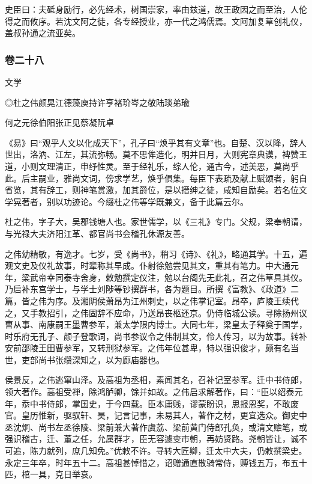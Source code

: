 \documentclass[]{article}
\begin{document}
史臣曰：夫砥身励行，必先经术，树国崇家，率由兹道，故王政因之而至治，人伦得之而攸序。若沈文阿之徒，各专经授业，亦一代之鸿儒焉。文阿加复草创礼仪，盖叔孙通之流亚矣。

\hypertarget{header-n5092}{%
\subsubsection{卷二十八}\label{header-n5092}}

文学

◎杜之伟颜晃江德藻庾持许亨褚玠岑之敬陆琰弟瑜

何之元徐伯阳张正见蔡凝阮卓

《易》曰``观乎人文以化成天下''，孔子曰``焕乎其有文章''也。自楚、汉以降，辞人世出，洛汭、江左，其流弥畅。莫不思侔造化，明并日月，大则宪章典谟，裨赞王道，小则文理清正，申纾性灵。至于经礼乐，综人伦，通古今，述美恶，莫尚乎此。后主嗣业，雅尚文词，傍求学艺，焕乎俱集。每臣下表疏及献上赋颂者，躬自省览，其有辞工，则神笔赏激，加其爵位，是以搢绅之徒，咸知自励矣。若名位文学晃著者，别以功迹论。今缀杜之伟等学既兼文，备于此篇云尔。

杜之伟，字子大，吴郡钱塘人也。家世儒学，以《三礼》专门。父规，梁奉朝请，与光禄大夫济阳江革、都官尚书会稽孔休源友善。

之伟幼精敏，有逸才。七岁，受《尚书》，稍习《诗》、《礼》，略通其学。十五，遍观文史及仪礼故事，时辈称其早成。仆射徐勉尝见其文，重其有笔力。中大通元年，梁武帝幸同泰寺舍身，敕勉撰定仪注，勉以台阁先无此礼，召之伟草具其仪。乃启补东宫学士，与学士刘陟等钞撰群书，各为题目。所撰《富教》、《政道》二篇，皆之伟为序。及湘阴侯萧昂为江州刺史，以之伟掌记室。昂卒，庐陵王续代之，又手教招引，之伟固辞不应命，乃送昂丧柩还京。仍侍临城公读。寻除扬州议曹从事、南康嗣王墨曹参军，兼太学限内博士。大同七年，梁皇太子释奠于国学，时乐府无孔子、颜子登歌词，尚书参议令之伟制其文，伶人传习，以为故事。转补安前邵陵王田曹参军，又转刑狱参军。之伟年位甚卑，特以强识俊才，颇有名当世，吏部尚书张缵深知之，以为廊庙器也。

侯景反，之伟逃窜山泽。及高祖为丞相，素闻其名，召补记室参军。迁中书侍郎，领大著作。高祖受禅，除鸿胪卿，馀并如故。之伟启求解著作，曰：``臣以绍泰元年，忝中书侍郎，掌国史，于今四载。臣本庸贱，谬蒙盼识，思报恩奖，不敢废官。皇历惟新，驱驭轩、昊，记言记事，未易其人，著作之材，更宜选众。御史中丞沈炯、尚书左丞徐陵、梁前兼大著作虞荔、梁前黄门侍郎孔奂，或清文赡笔，或强识稽古，迁、董之任，允属群才，臣无容遽变市朝，再妨贤路。尧朝皆让，诚不可追，陈力就列，庶几知免。''优敕不许。寻转大匠卿，迁太中大夫，仍敕撰梁史。永定三年卒，时年五十二。高祖甚悼惜之，诏赠通直散骑常侍，赙钱五万，布五十匹，棺一具，克日举哀。
\end{document}
